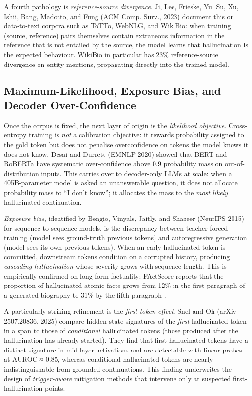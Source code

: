 \documentclass{article}
\begin{document}
A fourth pathology is \emph{reference-source divergence}. Ji, Lee, Frieske, Yu, Su, Xu, Ishii, Bang, Madotto, and Fung (ACM Comp. Surv., 2023) document this on data-to-text corpora such as ToTTo, WebNLG, and WikiBio: when training (source, reference) pairs themselves contain extraneous information in the reference that is not entailed by the source, the model learns that hallucination is the expected behaviour. WikiBio in particular has 23\% reference-source divergence on entity mentions, propagating directly into the trained model.

\subsection{Maximum-Likelihood, Exposure Bias, and Decoder Over-Confidence}\label{maximum-likelihood-exposure-bias-and-decoder-over-confidence}

Once the corpus is fixed, the next layer of origin is the \emph{likelihood objective}. Cross-entropy training is \emph{not} a calibration objective: it rewards probability assigned to the gold token but does not penalise overconfidence on tokens the model knows it does not know. Desai and Durrett (EMNLP 2020) showed that BERT and RoBERTa have systematic over-confidence above 0.9 probability mass on out-of-distribution inputs. This carries over to decoder-only LLMs at scale: when a 405B-parameter model is asked an unanswerable question, it does not allocate probability mass to ``I don't know''; it allocates the mass to the \emph{most likely} hallucinated continuation.

\emph{Exposure bias}, identified by Bengio, Vinyals, Jaitly, and Shazeer (NeurIPS 2015) for sequence-to-sequence models, is the discrepancy between teacher-forced training (model sees ground-truth previous tokens) and autoregressive generation (model sees its own previous tokens). When an early hallucinated token is committed, downstream tokens condition on a corrupted history, producing \emph{cascading hallucination} whose severity grows with sequence length. This is empirically confirmed on long-form factuality: FActScore reports that the proportion of hallucinated atomic facts grows from 12\% in the first paragraph of a generated biography to 31\% by the fifth paragraph \citep{min2023factscorefinegrain}.

A particularly striking refinement is the \emph{first-token effect}. Snel and Oh (arXiv 2507.20836, 2025) compare hidden-state signatures of the \emph{first} hallucinated token in a span to those of \emph{conditional} hallucinated tokens (those produced after the hallucination has already started). They find that first hallucinated tokens have a distinct signature in mid-layer activations and are detectable with linear probes at AUROC ≈ 0.85, whereas conditional hallucinated tokens are nearly indistinguishable from grounded continuations. This finding underwrites the design of \emph{trigger-aware} mitigation methods that intervene only at suspected first-hallucination points.
\end{document}
